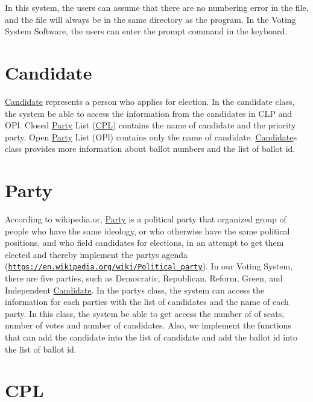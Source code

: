In this system, the users can assume that there are no numbering error in the file, and the file will always be in the same directory as the program. In the Voting System Software, the users can enter the prompt command in the keyboard.\hypertarget{index_candidate}{}\section{Candidate}\label{index_candidate}
\hyperlink{classCandidate}{Candidate} represents a person who applies for election. In the candidate class, the system be able to access the information from the candidates in C\+LP and O\+Pl. Closed \hyperlink{classParty}{Party} List (\hyperlink{classCPL}{C\+PL}) contains the name of candidate and the priority party. Open \hyperlink{classParty}{Party} List (O\+Pl) contains only the name of candidate. \hyperlink{classCandidate}{Candidate}\textquotesingle{}s class provides more information about ballot numbers and the list of ballot id.\hypertarget{index_party}{}\section{Party}\label{index_party}
According to wikipedia.\+or, \hyperlink{classParty}{Party} is a political party that organized group of people who have the same ideology, or who otherwise have the same political positions, and who field candidates for elections, in an attempt to get them elected and thereby implement the party\textquotesingle{}s agenda (\href{https://en.wikipedia.org/wiki/Political_party}{\tt https\+://en.\+wikipedia.\+org/wiki/\+Political\+\_\+party}). In our Voting System, there are five parties, such as Democratic, Republican, Reform, Green, and Independent \hyperlink{classCandidate}{Candidate}. In the party\textquotesingle{}s class, the system can access the information for each parties with the list of candidates and the name of each party. In this class, the system be able to get access the number of of seats, number of votes and number of candidates. Also, we implement the functions that can add the candidate into the list of candidate and add the ballot id into the list of ballot id.\hypertarget{index_cpl}{}\section{C\+PL}\label{index_cpl}
